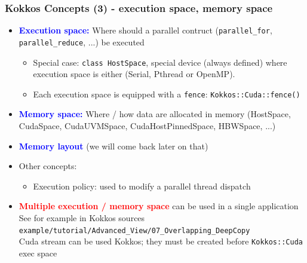 \begin{frame}
  \frametitle{Kokkos Concepts (3) - execution space, memory space}

  \begin{itemize}
  \item \textcolor{blue}{\textbf{Execution space:}} Where should a parallel contruct (\texttt{parallel\_for}, \texttt{parallel\_reduce}, ...) be executed\\
    \begin{itemize}
    \item Special case: \texttt{class HostSpace}, special device (always defined) where execution space is either (Serial, Pthread or OpenMP).
    \item Each execution space is equipped with a \texttt{fence}: \texttt{Kokkos::Cuda::fence()}
    \end{itemize}
  \item \textcolor{blue}{\textbf{Memory space:}} Where / how data are allocated in memory (HostSpace, CudaSpace, CudaUVMSpace, CudaHostPinnedSpace, HBWSpace, ...)
  \item \textcolor{blue}{\textbf{Memory layout}} (we will come back later on that)
  \item Other concepts:
    \begin{itemize}
    \item Execution policy: used to modify a parallel thread dispatch
    \end{itemize}
  \item \textcolor{red}{\bf Multiple execution / memory space} can be used in a single application\\
    See for example in Kokkos sources \texttt{example/tutorial/Advanced\_View/07\_Overlapping\_DeepCopy}\\
    Cuda stream can be used Kokkos; they must be created before {\tt Kokkos::Cuda} exec space
  \end{itemize}

\end{frame}

